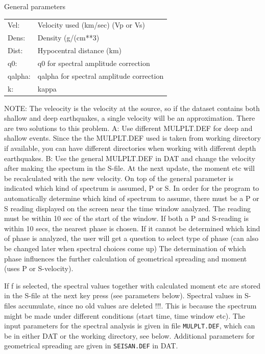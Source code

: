 General parameters 

\begin{tabular}{|ll|}
\hline
Vel: & Velocity used (km/sec) (Vp or Vs) \\
Dens: & Density (g/(cm**3) \\
Dist: & Hypocentral distance (km) \\
q0: & q0 for spectral amplitude correction \\
qalpha: & qalpha for spectral amplitude correction \\
k: & kappa \\
\hline
\end{tabular}
\newline

NOTE: The veleocity is the velocity at the source, so if the dataset contains both shallow and deep earthquakes, a single velocity will be an approximation. There are two solutions to this problem. A: Use different MULPLT.DEF for deep and shallow events. Since the the MULPLT.DEF used is taken from working directory if available, you can have different directories when working with different depth earthquakes. B: Use the general MULPLT.DEF in DAT and change the velocity after making the spectum in the S-file. At the next update, the moment etc will be recalculated with the new velocity.
On top of the general parameter is indicated which kind of spectrum  is assumed, P or S. In order for the program to automatically determine which kind of spectrum to assume, there must be a P or S reading displayed on the screen near the time window analyzed.  The reading must be within 10 sec of the start of the window. If both a P and S-reading is within 10 secs, the nearest phase is chosen. If it cannot be determined which kind of phase is analyzed, the user will get a question to select type of phase (can also be changed later when spectral choices come up) The determination of which phase influences the further calculation of geometrical spreading and moment (uses P or S-velocity). 

If f is selected, the spectral values together with calculated moment etc are stored in the S-file at the next key press (see parameters below). Spectral values in S-files accumulate, since no old values are deleted !!!. This is because the spectrum might be made under different conditions (start time, time window etc). The input parameters for the spectral analysis is given in file \texttt{MULPLT.DEF}, which can be in either DAT or the working directory, see below. Additional parameters for geometrical spreading are given in \texttt{SEISAN.DEF} in DAT. 

